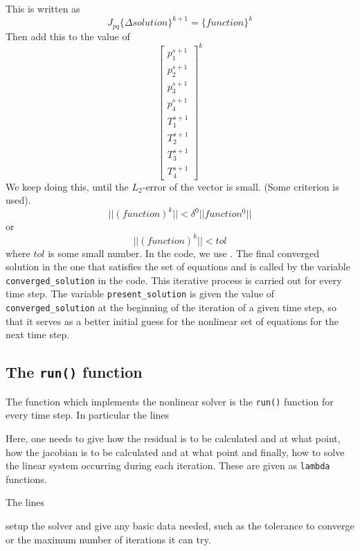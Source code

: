 \documentclass[preprint,12pt]{elsarticle}
\newcommand{\te}[1]{\lstinline{#1}}
\numberwithin{equation}{section}
\begin{document}
This is written as
\begin{equation}
	J_{pq}\{\Delta solution\}^{k+1}=\{function\}^{k}
\end{equation}
Then add this to the value of 
\begin{equation}
	\begin{bmatrix}
		p_1^{s+1}\\
		p_2^{s+1}\\
		p_3^{s+1}\\
		p_4^{s+1}\\
		T_1^{s+1}\\
		T_2^{s+1}\\
		T_3^{s+1}\\
		T_4^{s+1}
	\end{bmatrix}^{k}
\end{equation}
We keep doing this, until the $L_2$-error of the vector is small. (Some criterion is used).
\begin{equation}
	||(function)^k||<\delta^0 ||function^0||
\end{equation}
or
\begin{equation}
	||(function)^k||<tol
	\label{tol:two}
\end{equation}
where $tol$ is some small number. In the code, we use . The final converged solution in the one that satisfies the set of equations and is called by the variable \lstinline!converged_solution! in the code. This iterative process is carried out for every time step. The variable \lstinline|present_solution| is given the value of \lstinline|converged_solution| at the beginning of the iteration of a given time step, so that it serves as a better initial guess for the nonlinear set of equations for the next time step.
\subsection{The \te{run()} function}
The function which implements the nonlinear solver is the \te{run()} function for every time step. In particular the lines

Here, one needs to give how the residual is to be calculated and at what point, how the jacobian is to be calculated and at what point and finally, how to solve the linear system occurring during each iteration. These are given as \te{lambda} functions. 

The lines

setup the solver and give any basic data needed, such as the tolerance to converge or the maximum number of iterations it can try. 
\end{document}
